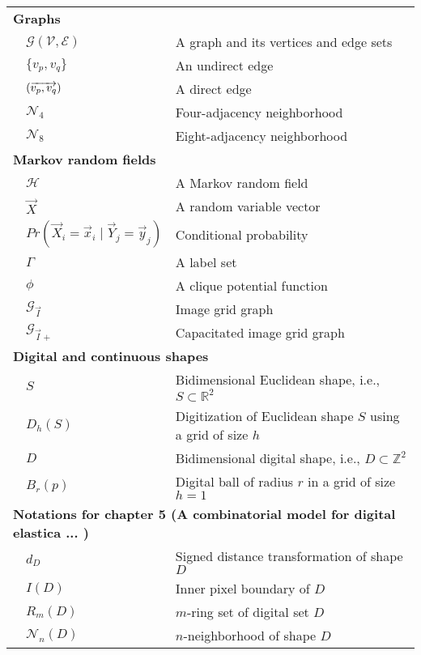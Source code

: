 {\begin{longtable}{p{0.5cm}ll}
\multicolumn{3}{l}{\textbf{Graphs}}\\
& $\mathcal{G}(\mathcal{V},\mathcal{E})$ & A graph and its vertices and edge sets \\
& $\{v_p,v_q\}$ & An undirect edge \\ 
& $( \overrightarrow{ v_p,v_q} )$ & A direct edge \\
& $\mathcal{N}_4$ & Four-adjacency neighborhood \\
& $\mathcal{N}_8$ & Eight-adjacency neighborhood \\[1em]


\multicolumn{3}{l}{\textbf{Markov random fields}}\\
& $\mathcal{H}$ & A Markov random field\\
& $\vec{X}$ & A random variable vector \\
& $Pr(\vec{X}_i=\vec{x}_i\;|\;\vec{Y}_j=\vec{y}_j )$ & Conditional probability \\
& $\Gamma$ & A label set \\
& $\phi$ & A clique potential function \\
& $\mathcal{G}_{\vec{I}}$ & Image grid graph \\
& $\mathcal{G}_{\vec{I}+}$ & Capacitated image grid graph\\[1em]

\multicolumn{3}{l}{\textbf{Digital and continuous shapes}}\\
& $S$ & Bidimensional Euclidean shape, i.e.,  $S \subset \mathbb{R}^2$\\
& $D_h(S)$ & Digitization of Euclidean shape $S$  using a grid of size $h$\\
& $D$ & Bidimensional digital shape, i.e., $D \subset \mathbb{Z}^2$\\
& $B_r(p)$ & Digital ball of radius $r$  in a grid of size $h=1$ \\[1em]

\multicolumn{3}{l}{\textbf{Notations for chapter 5 (A combinatorial model for digital elastica ... )}}\\
& $d_D$ & Signed distance transformation of shape $D$\\
& $I(D)$ & Inner pixel boundary of $D$\\
& $R_m(D)$ & $m$-ring set of digital set $D$\\
& $\mathcal{N}_n(D)$ & $n$-neighborhood of shape $D$\\[1em]


\end{longtable}}
